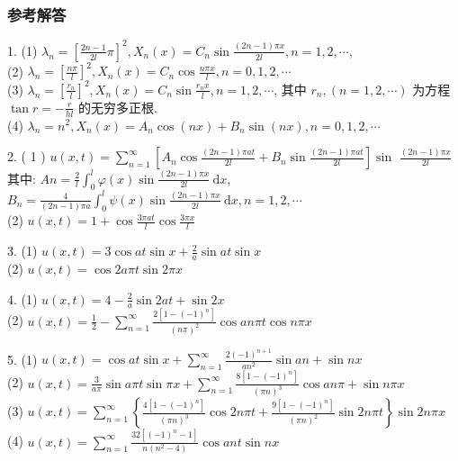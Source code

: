 \subsubsection{参考解答}
\begin{solution}
1. (1) $ \lambda_{n}=\left[\frac{2 n-1}{2 l} \pi\right]^{2}, X_{n}(x)=C_{n} \sin \frac{(2 n-1) \pi x}{2 l}, n=1,2, \cdots $,\\
(2) $ \lambda_{n}=\left[\frac{n \pi}{l}\right]^{2}, X_{n}(x)=C_{n} \cos \frac{n \pi x}{l}, n=0,1,2, \cdots $\\
(3) $ \lambda_{n}=\left[\frac{r_{n}}{l}\right]^{2}, X_{n}(x)=C_{n} \sin \frac{r_{n} x}{l}, n=1,2, \cdots $, 其中 $ r_{n},(n=1,2, \cdots) $ 为方程$ \tan r=-\frac{r}{h l} $ 的无穷多正根.\\
(4) $ \lambda_{n}=n^{2}, X_{n}(x)=A_{n} \cos (n x)+B_{n} \sin (n x), n=0,1,2, \cdots $

2. ( 1 ) $ u(x, t)=\sum\limits_{n=1}^{\infty}\left[A_{n} \cos \frac{(2 n-1) \pi a t}{2 l}+B_{n} \sin \frac{(2 n-1) \pi a t}{2 l}\right] \sin $ $ \frac{(2 n-1) \pi x}{2 l} $ \\其中: $ A n=\frac{2}{l} \int_{0}^{l} \varphi(x) \sin \frac{(2 n-1) \pi x}{2 l} \mathrm{~d} x $,
$
B_{n}=\frac{4}{(2 n-1) \pi a} \int_{0}^{l} \psi(x) \sin \frac{(2 n-1) \pi x}{2 l} \mathrm{~d} x, n=1,2, \cdots
$\\
(2) $ u(x, t)=1+\cos \frac{3 \pi a t}{l} \cos \frac{3 \pi x}{l} $

3. (1) $ u(x, t)=3 \cos a t \sin x+\frac{2}{a} \sin a t \sin x $\\
(2) $ u(x, t)=\cos 2 a \pi t \sin 2 \pi x $

4. (1) $ u(x, t)=4-\frac{2}{a} \sin 2 a t+\sin 2 x $\\
(2) $ u(x, t)=\frac{1}{2}-\sum\limits_{n=1}^{\infty} \frac{2\left[1-(-1)^{n}\right]}{(n \pi)^{2}} \cos a n \pi t \cos n \pi x $

5. (1) $ u(x, t)=\cos a t \sin x+\sum\limits_{n=1}^{\infty} \frac{2(-1)^{n+1}}{a n^{2}} \sin a n+\sin n x $\\
(2) $ u(x, t)=\frac{3}{a \pi} \sin a \pi t \sin \pi x+\sum\limits_{n=1}^{\infty} \frac{8\left[1-(-1)^{n}\right]}{(\pi n)^{3}} \cos a n \pi+\sin n \pi x $\\
(3) $ u(x, t)=\sum\limits_{n=1}^{\infty}\left\{\frac{4\left[1-(-1)^{n}\right]}{(\pi n)^{3}} \cos 2 n \pi t+\frac{9\left[1-(-1)^{n}\right]}{(\pi n)^{2}} \sin 2 n \pi t\right\} \sin 2 n \pi x $\\
(4) $ u(x, t)=\sum\limits_{n=1}^{\infty} \frac{32\left[(-1)^{n}-1\right]}{n\left(n^{2}-4\right)} \cos a n t \sin n x $


\end{solution}
